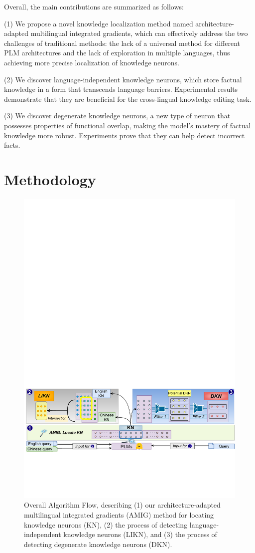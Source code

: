 \documentclass[]{article}
\begin{document}
Overall, the main contributions are summarized as follows:

(1) We propose a novel knowledge localization method named architecture-adapted multilingual integrated gradients, which can effectively address the two challenges of traditional methods: the lack of a universal method for different PLM architectures and the lack of exploration in multiple languages, thus achieving more precise localization of knowledge neurons.

(2) We discover language-independent knowledge neurons, which store factual knowledge in a form that transcends language barriers. Experimental results demonstrate that they are beneficial for the cross-lingual knowledge editing task.

(3) We discover degenerate knowledge neurons, a new type of neuron that possesses properties of functional overlap, making the model's mastery of factual knowledge more robust. Experiments prove that they can help detect incorrect facts.




\section{Methodology}
\begin{figure}[t]
\centering
\includegraphics[width=0.7\linewidth]{figures/overall5.drawio.pdf}
\caption{Overall Algorithm Flow, describing (1) our architecture-adapted multilingual integrated gradients (AMIG) method for locating knowledge neurons (KN), (2) the process of detecting language-independent knowledge neurons (LIKN), and (3) the process of detecting degenerate knowledge neurons (DKN).}
\label{fig:overall}
\end{figure}
\end{document}

